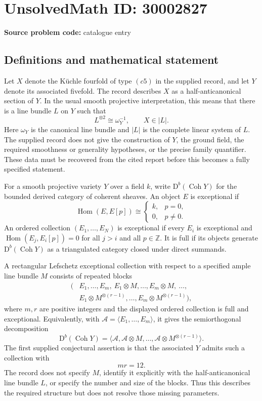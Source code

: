 \documentclass[11pt]{article}
\newcommand{\Z}{\mathbb{Z}}
\begin{document}
\section*{UnsolvedMath ID: 30002827}
\textbf{Source problem code:} catalogue entry
\subsection{Definitions and mathematical statement}
Let \(X\) denote the K\"uchle fourfold of type \((c5)\) in the supplied record, and let \(Y\) denote its associated fivefold. The record describes \(X\) as a half-anticanonical section of \(Y\). In the usual smooth projective interpretation, this means that there is a line bundle \(L\) on \(Y\) such that
\[
L^{\otimes 2}\cong\omega_Y^{-1},\qquad X\in |L|.
\]
Here \(\omega_Y\) is the canonical line bundle and \(|L|\) is the complete linear system of \(L\). The supplied record does not give the construction of \(Y\), the ground field, the required smoothness or generality hypotheses, or the precise family quantifier. These data must be recovered from the cited report before this becomes a fully specified statement.

For a smooth projective variety \(Y\) over a field \(k\), write \(\mathrm D^b(\operatorname{Coh}Y)\) for the bounded derived category of coherent sheaves. An object \(E\) is exceptional if
\[
\operatorname{Hom}(E,E[p])\cong
\begin{cases}
k,&p=0,\\
0,&p\ne 0.
\end{cases}
\]
An ordered collection \((E_1,\ldots,E_N)\) is exceptional if every \(E_i\) is exceptional and \(\operatorname{Hom}(E_j,E_i[p])=0\) for all \(j>i\) and all \(p\in\Z\). It is full if its objects generate \(\mathrm D^b(\operatorname{Coh}Y)\) as a triangulated category closed under direct summands.

A rectangular Lefschetz exceptional collection with respect to a specified ample line bundle \(M\) consists of repeated blocks
\[
\begin{split}
(&E_1,\ldots,E_m,\ E_1\otimes M,\ldots,E_m\otimes M,\ \ldots,\\
 &E_1\otimes M^{\otimes(r-1)},\ldots,E_m\otimes M^{\otimes(r-1)}),
\end{split}
\]
where \(m,r\) are positive integers and the displayed ordered collection is full and exceptional. Equivalently, with \(\mathcal A=\langle E_1,\ldots,E_m\rangle\), it gives the semiorthogonal decomposition
\[
\mathrm D^b(\operatorname{Coh}Y)
=\langle\mathcal A,\mathcal A\otimes M,\ldots,
\mathcal A\otimes M^{\otimes(r-1)}\rangle.
\]
The first supplied conjectural assertion is that the associated \(Y\) admits such a collection with
\[
mr=12.
\]
The record does not specify \(M\), identify it explicitly with the half-anticanonical line bundle \(L\), or specify the number and size of the blocks. Thus this describes the required structure but does not resolve those missing parameters.
\end{document}
